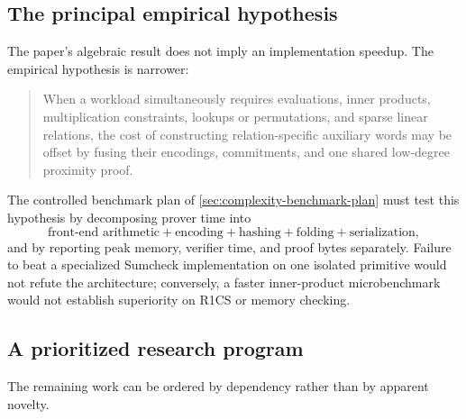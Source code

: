 \subsection{The principal empirical hypothesis}
\label{sec:limitations-empirical}

The paper's algebraic result does not imply an implementation speedup.  The empirical hypothesis is narrower:

\begin{quote}
When a workload simultaneously requires evaluations, inner products, multiplication constraints, lookups or permutations, and sparse linear relations, the cost of constructing relation-specific auxiliary words may be offset by fusing their encodings, commitments, and one shared low-degree proximity proof.
\end{quote}

The controlled benchmark plan of \cref{sec:complexity-benchmark-plan} must test this hypothesis by decomposing prover time into
\[
  \text{front-end arithmetic}
  +\text{encoding}
  +\text{hashing}
  +\text{folding}
  +\text{serialization},
\]
and by reporting peak memory, verifier time, and proof bytes separately.  Failure to beat a specialized Sumcheck implementation on one isolated primitive would not refute the architecture; conversely, a faster inner-product microbenchmark would not establish superiority on R1CS or memory checking.

\subsection{A prioritized research program}
\label{sec:limitations-roadmap}

The remaining work can be ordered by dependency rather than by apparent novelty.

